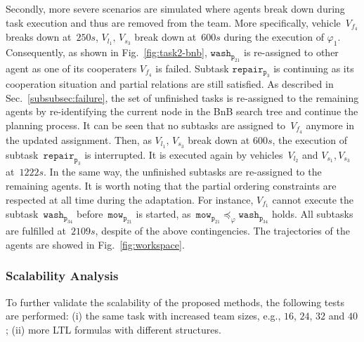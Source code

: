 Secondly, more severe scenarios are simulated where agents break down
during task execution and thus are removed from the team.
More specifically, vehicle~$V_{f_4}$ breaks down at~$250s$, $V_{l_1},\, V_{s_3}$ break
down at~$600s$ during the execution of $\varphi_1$.
Consequently, as shown in Fig.~\ref{fig:task2-bnb}, $\texttt{wash}_{\texttt{p}_{21}}$
is re-assigned to other agent as one of its cooperaters $V_{f_4}$ is failed. Subtask
$\texttt{repai}$$\texttt{r}_{\texttt{p}_{3}}$ is continuing as its cooperation situation and partial relations
are still satisfied. As described in Sec.~\ref{subsubsec:failure},
the set of unfinished tasks is re-assigned to the remaining agents by re-identifying
the current node in the BnB search tree and continue the planning process.
It can be seen that no subtasks are assigned to~$V_{f_4}$ anymore in the updated assignment.
Then, as $V_{l_1},\, V_{s_3}$ break down at $600s$, the execution of subtask~$\texttt{repair}_{\texttt{p}_{3}}$
is interrupted. It is executed again by vehicles~$V_{l_2}$ and $V_{s_1},V_{s_3}$ at~$1222s$.
In the same way, the unfinished subtasks are re-assigned to the remaining agents.
It is worth noting that the partial ordering constraints are respected at all
time during the adaptation.
For instance, $V_{f_1}$ cannot execute the subtask~$\texttt{wash}_{\texttt{p}_{34}}$
before~$\texttt{mow}_{\texttt{p}_{21}}$ is started,
as~$\texttt{mow}_{\texttt{p}_{21}}\preceq_\varphi\texttt{wash}_{\texttt{p}_{34}}  $ holds.
All subtasks are fulfilled at~$2109s$, despite of the above contingencies. 
The trajectories of the agents are showed in Fig.~\ref{fig:workspace}.



\subsubsection{Scalability Analysis}\label{subsubsec:scalable}
To further validate the scalability of the proposed methods,
the following tests are performed:
(i) the same task with increased team sizes,
e.g., $16$, $24$, $32$ and $40$;
(ii) more LTL formulas with different structures.

